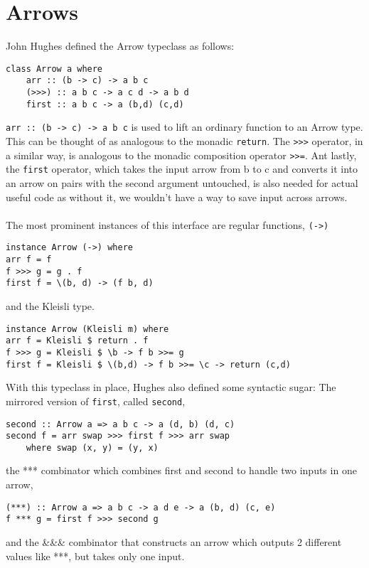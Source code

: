 \section{Arrows}

John Hughes defined the Arrow typeclass as follows\citHughes:
\begin{lstlisting}[frame=htrbl, caption={Arrow definition}]
class Arrow a where
	arr :: (b -> c) -> a b c
	(>>>) :: a b c -> a c d -> a b d
	first :: a b c -> a (b,d) (c,d)
\end{lstlisting}
\lstinline{arr :: (b -> c) -> a b c} is used to lift an ordinary function to an Arrow type. This can be thought of as analogous to the monadic \lstinline{return}. The \lstinline{>>>} operator, in a similar way, is analogous to the monadic composition operator \lstinline{>>=}. Ant lastly, the \lstinline{first} operator, which takes the input arrow from b to c and converts it into an arrow on pairs with the second argument untouched, is also needed for actual useful code as without it, we wouldn't have a way to save input across arrows.
\\\\
The most prominent instances of this interface are regular functions, \lstinline{(->)}
\begin{lstlisting}[frame=htrbl, caption={Arrow instance for \lstinline{(->)}}]
instance Arrow (->) where
arr f = f
f >>> g = g . f
first f = \(b, d) -> (f b, d) 
\end{lstlisting}
and the Kleisli type.
\begin{lstlisting}[frame=htrbl, caption={Arrow instance for \lstinline{(->)}}]
instance Arrow (Kleisli m) where
arr f = Kleisli $ return . f
f >>> g = Kleisli $ \b -> f b >>= g
first f = Kleisli $ \(b,d) -> f b >>= \c -> return (c,d)
\end{lstlisting}
With this typeclass in place, Hughes also defined some syntactic sugar: The mirrored version of \lstinline{first}, called \lstinline{second},
\begin{lstlisting}[frame=htrbl]
second :: Arrow a => a b c -> a (d, b) (d, c)
second f = arr swap >>> first f >>> arr swap
	where swap (x, y) = (y, x)
\end{lstlisting}
the *** combinator which combines first and second to handle two inputs in one arrow,
\begin{lstlisting}[frame=htrbl]
(***) :: Arrow a => a b c -> a d e -> a (b, d) (c, e)
f *** g = first f >>> second g
\end{lstlisting}
and the \&\&\& combinator that constructs an arrow which outputs 2 different values like ***, but takes only one input.

